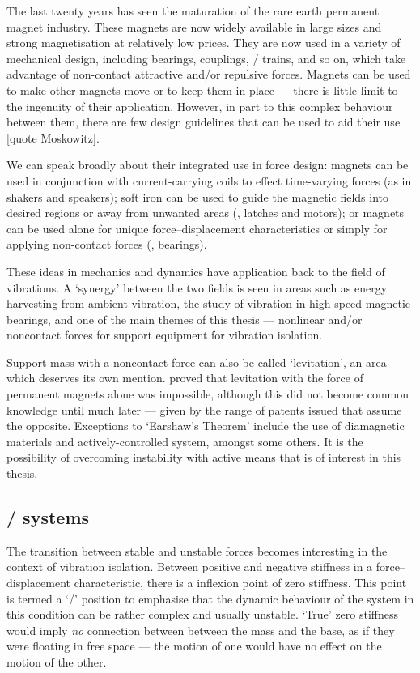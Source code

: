 The last twenty years has seen the maturation of the rare earth permanent magnet industry.
These magnets are now widely available in large sizes and strong magnetisation at relatively low prices.
They are now used in a variety of mechanical design, including bearings, couplings, \maglev/ trains, and so on, which take advantage of non-contact attractive and/or repulsive forces.
Magnets can be used to make other magnets move or to keep them in place — there is little limit to the ingenuity of their application.
However, in part to this complex behaviour between them, there are few design guidelines that can be used to aid their use [quote Moskowitz].

We can speak broadly about their integrated use in force design: magnets can
be used in conjunction with current-carrying coils to effect time-varying
forces (as in shakers and speakers); soft iron can be used to guide the
magnetic fields into desired regions or away from unwanted areas (\eg, latches
and motors); or magnets can be used alone for unique force--displacement
characteristics or simply for applying non-contact forces (\eg, bearings).

These ideas in mechanics and dynamics have application back to the field of
vibrations.
A `synergy' between the two fields is seen in areas such as energy
harvesting from ambient vibration, the study of vibration in high-speed
magnetic bearings, and one of the main themes of this thesis — nonlinear
and/or noncontact forces for support equipment for vibration isolation.

Support mass with a noncontact force can also be called `levitation', an area
which deserves its own mention.
\textcite{earnshaw1842} proved that levitation
with the force of permanent magnets alone was impossible, although this did
not become common knowledge  until much later — given
by the range of patents issued that assume the opposite.
Exceptions to
`Earshaw's Theorem' include the use of diamagnetic materials and
actively-controlled system, amongst some others.
It is the possibility of
overcoming instability with active means that is of interest in this thesis.

\subsection{\QZS/ systems}

The transition between stable and unstable forces becomes interesting in the
context of vibration isolation.
Between positive and negative stiffness in a
force--displacement characteristic, there is a inflexion point of zero
stiffness.
This point is termed a `\qzs/' position to emphasise that the
dynamic behaviour of the system in this condition can be rather complex and
usually unstable.
`True' zero stiffness would imply \emph{no} connection
between between the mass and the base, as if they were floating in free space
— the motion of one would have no effect on the motion of the other.


